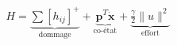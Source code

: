 \documentclass[preview]{standalone}
\begin{document}
\begin{align*}
H =  \underbrace{\sum [h_{ij}]^+}_{\text{dommage}} +  \underbrace{\mathbf{p}^T \!\dot{\mathbf{x}}}_{\text{co-\'etat}} +  \underbrace{\tfrac{\gamma}{2}\|u\|^2}_{\text{effort}}
\end{align*}
\end{document}
